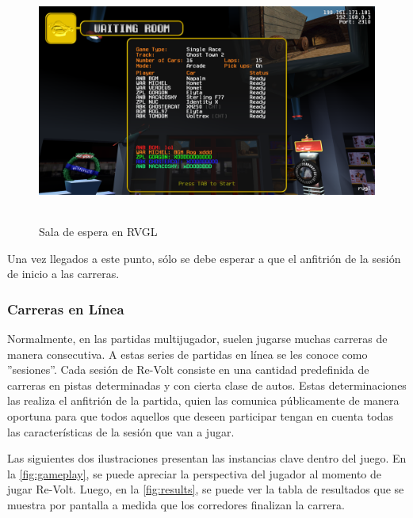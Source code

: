 \begin{figure}[H]
  \begin{center}
    \includegraphics[width=15cm, height=8cm]{img/lobby.png}
  \end{center}
  \caption[Sala de espera en RVGL]{Sala de espera en RVGL}
  \label{fig:lobby}
\end{figure}

Una vez llegados a este punto, sólo se debe esperar a que el anfitrión de la sesión de inicio a las carreras.

\subsubsection{Carreras en Línea}
Normalmente, en las partidas multijugador, suelen jugarse muchas carreras de manera consecutiva. A estas series de partidas en línea se les conoce como ''sesiones''. Cada sesión de Re-Volt consiste en una cantidad predefinida de carreras en pistas determinadas y con cierta clase de autos. Estas determinaciones las realiza el anfitrión de la partida, quien las comunica públicamente de manera oportuna para que todos aquellos que deseen participar tengan en cuenta todas las características de la sesión que van a jugar.

Las siguientes dos ilustraciones presentan las instancias clave dentro del juego. En la \autoref{fig:gameplay}, se puede apreciar la perspectiva del jugador al momento de jugar Re-Volt. Luego, en la \autoref{fig:results}, se puede ver la tabla de resultados que se muestra por pantalla a medida que los corredores finalizan la carrera.

